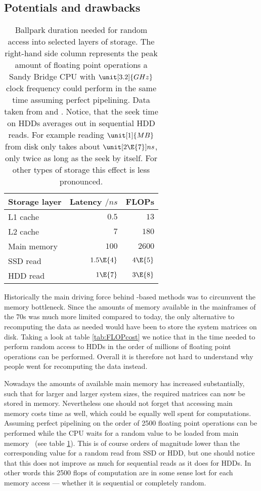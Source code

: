 \subsection{Potentials and drawbacks}
\label{sec:ContractionPotentialCaveat}

\begin{table}
	\centering
	\begin{tabular}{lrr}
		\toprule
		Storage layer  & Latency $/\unit{ns}$ & FLOPs \\
		\midrule
		L1 cache       & $0.5$                &  $13$  \\
		L2 cache       & $7$                  &  $180$ \\
		Main memory    & $100$                &  $2600$ \\
		SSD read       & $1.5\E{4}$           &  $4\E{5}$ \\
		HDD read       & $1\E{7}$             &  $3\E{8}$ \\
		\bottomrule
	\end{tabular}
	\caption[Duration needed for random access into storage]{
		Ballpark duration needed for random access into selected
		layers of storage.
		The right-hand side column represents the peak amount
		of floating point operations a Sandy Bridge CPU with $\unit[3.2]{GHz}$
		clock frequency could perform in the same time
		assuming perfect pipelining.
		Data taken from \cite{CpuData} and \cite{LatencyWeb}.
		Notice, that the seek time on HDDs averages out
		in sequential HDD reads.
		For example reading $\unit[1]{MB}$ from disk only takes about $\unit[2\E{7}]{ns}$,
		\ie only twice as long as the seek by itself.
		For other types of storage this effect is less pronounced.
	}
	\label{tab:FLOPcost}
\end{table}

Historically the main driving force behind \contraction-based
methods was to circumvent the memory bottleneck.
Since the amounts of memory available in the mainframes of the 70s
was much more limited compared to today,
the only alternative to recomputing the data as needed
would have been to store the system matrices on disk.
Taking a look at table \vref{tab:FLOPcost}
we notice that in the time needed to perform random access to HDDs
in the order of millions of floating point operations can be performed.
Overall it is therefore not hard to understand why
people went for recomputing the data instead.

Nowadays the amounts of available main memory has increased substantially,
such that for larger and larger system sizes,
the required matrices can now be stored in memory.
Nevertheless one should not forget that accessing main memory costs time as well,
which could be equally well spent for computations.
Assuming perfect pipelining
on the order of 2500 floating point operations can be performed
while the CPU waits for a random value to be loaded from main memory%
~(see table \ref{tab:FLOPcost}).
This is of course orders of magnitude lower than the corresponding
value for a random read from SSD or HDD,
but one should notice that this does not improve as much for sequential
reads as it does for HDDs.
In other words this 2500 flops of computation are
in some sense lost for each memory access
--- whether it is sequential or completely random.

